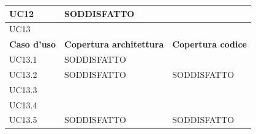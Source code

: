 \documentclass[openany,12pt,a4paper]{report}
\begin{document}
\begin{longtable}{|p{40mm}|p{40mm}|p{40mm}|}
		\hline \centering UC12 & SODDISFATTO & \\
		\hline \centering UC13 &  & \\
		\hline \centering \textbf{Caso d'uso} & \textbf{Copertura architettura} &  \textbf{Copertura codice}\\
		\hline \centering UC13.1 & SODDISFATTO & \\
		\hline \centering UC13.2 & SODDISFATTO & SODDISFATTO\\
		\hline \centering UC13.3 &  & \\
		\hline \centering UC13.4 &  & \\
		\hline \centering UC13.5 & SODDISFATTO & SODDISFATTO\\
		\hline
		
	\end{longtable}
	
	\newpage
	
\end{document}

